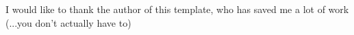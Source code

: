 %
%
%

I would like to thank the author of this template, who has saved me a lot of work (...you don't actually have to)